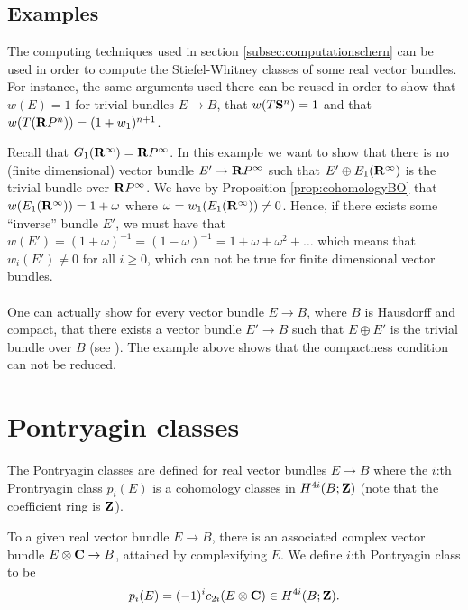 \documentclass[a4paper,openany]{scrbook}
\begin{document}
\subsection{Examples}
The computing techniques used in section \ref{subsec:computationschern} can be used in order to compute the Stiefel-Whitney classes of some real vector bundles. For instance, the same arguments used there can be reused in order to show that $w(E)=1$ for trivial bundles $E\to B$, that $w(T\S^n)=1$ and that $w(T(\R P^n))=(1+w_1)^{n+1}$.
\begin{example} Recall that $G_1(\R^\infty)=\R P^\infty$.
In this example we want to show that there is no (finite dimensional) vector bundle $E'\to\R P^\infty$ such that $E'\oplus E_1(\R^\infty)$ is the trivial bundle over $\R P^\infty$. We have by Proposition \ref{prop:cohomologyBO} that $w(E_1(\R^\infty))= 1+\omega$ where $\omega = w_1(E_1(\R^\infty))\neq 0$. Hence, if there exists some ``inverse'' bundle $E'$, we must have that $w(E')=(1+\omega)^{-1} = (1-\omega)^{-1} = 1+\omega+\omega^2+\dots$ which means that $w_i(E')\neq 0$ for all $i\geq 0$, which can not be true for finite dimensional vector bundles.
\\\\
One can actually show  for every vector bundle $E\to B$, where $B$ is Hausdorff and compact, that there exists a vector bundle $E'\to B$ such that $E\oplus E'$ is the trivial bundle over $B$ (see \cite[Proposition 1.4.]{hatcher:K-theory}). The example above shows that the compactness condition can not be reduced.
\end{example}







\section{Pontryagin classes} The Pontryagin classes are defined for real vector bundles $E\to B$ where the $i$:th Prontryagin class $p_i(E)$ is a cohomology classes in $H^{4i}(B;\Z)$ (note that the coefficient ring is $\Z$).

To a given real vector bundle $E\to B$, there is an associated complex vector bundle $E\otimes \CC\to B$, attained by complexifying $E$. We define $i$:th  Pontryagin class to be 
$$p_i(E)= (-1)^ic_{2i}(E\otimes \CC)\in H^{4i}(B;\Z).$$
\end{document}
